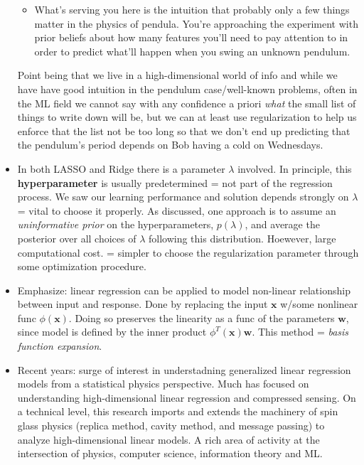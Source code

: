 \documentclass[norsk,a4paper,11pt]{article}
\begin{document}
\begin{itemize}
{\begin{itemize}
		\item What's serving you here is the intuition that probably only a few things matter in the physics of pendula. You're approaching the experiment with prior beliefs about how many features you'll need to pay attention to in order to predict what'll happen when you swing an unknown pendulum. 
	\end{itemize}}
	Point being that we live in a high-dimensional world of info and while we have have good intuition in the pendulum case/well-known problems, often in the ML field we cannot say with any confidence a priori \textit{what} the small list of things to write down will be, but we can at least use regularization to help us enforce that the list not be too long so that we don't end up predicting that the pendulum's period depends on Bob having a cold on Wednesdays.
	\item In both LASSO and Ridge there is a parameter $\lambda$ involved. In principle, this \textbf{hyperparameter} is usually predetermined = not part of the regression process. We saw our learning performance and solution depends strongly on $\lambda$ = vital to choose it properly. As discussed, one approach is to assume an \textit{uninformative prior} on the hyperparameters, $p(\lambda)$, and average the posterior over all choices of $\lambda$ following this distribution. Hoewever, large computational cost. = simpler to choose the regularization parameter through some optimization procedure.
	\item Emphasize: linear regression can be applied to model non-linear relationship between input and response. Done by replacing the input $\bm{x}$ w/some nonlinear func $\phi(\bm{x})$. Doing so preserves the linearity as a func of the parameters $\bm{w}$, since model is defined by the inner product $\phi^T (\bm{x}) \bm{w}$. This method = \textit{basis function expansion}. 
	\item Recent years: surge of interest in understadning generalized linear regression models from a statistical physics perspective. Much has focused on understanding high-dimensional linear regression and compressed sensing. On a technical level, this research imports and extends the machinery of spin glass physics (replica method, cavity method, and message passing) to analyze high-dimensional linear models. A rich area of activity at the intersection of physics, computer science, information theory and ML.
\end{itemize}
\end{document}
